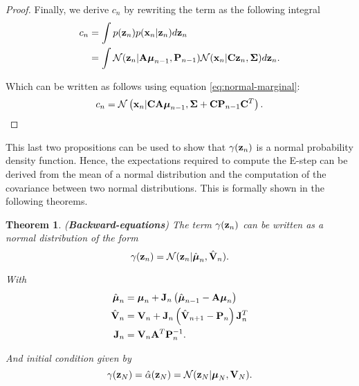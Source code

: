 \documentclass[11pt]{article}
\numberwithin{equation}{section}
\newcommand{\x}{{\bf x}}
\newcommand{\z}{{\bf z}}
\newcommand{\N}{\mathcal{N}}
\newtheorem{theorem}{Theorem}[section]
\begin{document}
\begin{proof}
	Finally, we derive $c_n$ by rewriting the term as the following integral
	\begin{align}
		c_n &= \int p(\z_n) p (\x_n \vert \z_n) d\z_n\\
			&= \int \N(\z_n\vert {\bf A} \boldsymbol\mu_{n-1}, {\bf P}_{n-1}) \N(\x_n \vert {\bf C}\z_n, \boldsymbol\Sigma) d\z_n.
	\end{align}
	
	Which can be written as follows using equation \eqref{eq:normal-marginal}:
	\begin{equation}
		c_n = \N\left(\x_n \vert {\bf C}{\bf A}\boldsymbol\mu_{n-1}, \boldsymbol\Sigma + {\bf C}{\bf P}_{n-1}{\bf C}^T\right).
	\end{equation}	
\end{proof}


This last two propositions can be used to show that $\gamma(\z_n)$ is a normal probability density function. Hence, the expectations required to compute the E-step can be derived from the mean of a normal distribution and the computation of the covariance between two normal distributions. This is formally shown in the following theorems.


\begin{theorem} (\textbf{Backward-equations}) \label{theorem:beta-backward-equations}
	The term $\gamma(\z_n)$ can be written as a normal distribution of the form
	\begin{equation}
		\gamma(\z_n) = \N(\z_n\vert \hat{\boldsymbol\mu}_n, \hat{\bf V}_n).
	\end{equation}
	
	With
	\begin{align}
		\hat{\boldsymbol{\mu}}_n &= \boldsymbol{\mu}_n + {\bf J}_n\left(\hat{\boldsymbol \mu}_{n-1} - {\bf A}\boldsymbol\mu_n\right)\\
		\hat{\bf V}_n &= {\bf V}_n + {\bf J}_n\left(\hat{\bf V}_{n+1} - {\bf P}_n\right){\bf J}_n^T\\
		{\bf J}_n &= {\bf V}_n{\bf A}^T{\bf P}_n^{-1}.
	\end{align}
	
	And initial condition given by
	\begin{equation}
		\gamma(\z_N) = \hat\alpha(\z_N) = \N(\z_N\vert \boldsymbol\mu_N, {\bf V}_N).
	\end{equation}
\end{theorem}
\end{document}
